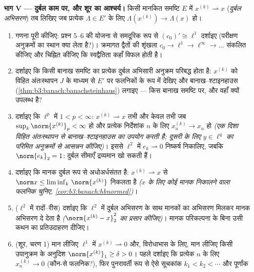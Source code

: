 \begin{problem}[{सप्ताहांत समस्या --- $(\ell^p)' = \ell^q$, स्वद्वैतिता, और
$\ell^\infty$ की विचित्रता}]
\medskip
\noindent\textbf{भाग V --- दुर्बल  काम पर, और शूर का
आश्चर्य।} किसी मानकित समष्टि $E$ में $x^{(k)} \rightharpoonup x$ (\emph{दुर्बल
अभिसरण}) तब लिखिए जब प्रत्येक $\Lambda \in E'$ के लिए $\Lambda(x^{(k)}) \to \Lambda(x)$ हो।
\begin{enumerate}[resume]
  \item गणना पूरी कीजिए: प्रश्न 5--6 की योजना से समदूरिक रूप से
        $(c_0)' \cong \ell^1$ दर्शाइए (परीक्षण अनुक्रमों का स्थान क्या लेता है?)।
        क्रमागत द्वैतों की शृंखला $c_0 \to \ell^1 \to \ell^\infty \to \dots$ संकलित कीजिए और चिह्नित
        कीजिए कि स्वद्वैतिता कहाँ विफल होती है।
  \item दर्शाइए कि किसी बानाख समष्टि का प्रत्येक दुर्बल अभिसारी
        अनुक्रम परिबद्ध होता है: $x^{(k)}$ को विहित अंतःस्थापन $J$
        के माध्यम से $E'$ पर फलनिकों के रूप में देखिए और
        बानाख--श्टाइनहाउस (\cref{thm:b3:banach:banachsteinhaus}) लगाइए --- किस बानाख समष्टि पर,
        और वहाँ  क्यों उपलब्ध है?
  \item दर्शाइए कि $\ell^p$ में $1 < p < \infty$: $x^{(k)}
        \rightharpoonup x$ तभी और केवल तभी जब
        $\sup_k\norm{x^{(k)}}_p <
        \infty$ हो और प्रत्येक निर्देशांक $n$ के लिए $x^{(k)}_n \to x_n$ हो
        \emph{(एक दिशा विहित अंतःस्थापन से बानाख--श्टाइनहाउस का
        उपयोग करती है; दूसरी के लिए $y
        \in \ell^q$ का परिमित अनुक्रमों से
        आसन्नन कीजिए)}। इससे $\ell^2$ में $e_k
        \rightharpoonup 0$ निष्कर्ष निकालिए,
        जबकि $\norm{e_k}_2 =
        1$: दुर्बल सीमाएँ द्रव्यमान खो सकती हैं।
  \item दर्शाइए कि मानक दुर्बल रूप से अधोअर्धसंतत है: $x^{(k)} \rightharpoonup x$ से
        $\norm x \leq
        \liminf_k\,\norm{x^{(k)}}$ निकलता है \emph{($x$ के लिए कोई मानक निकालने वाला
        फलनिक चुनिए, \cref{cor:b3:banach:hbnormed})}।
  \item ($\ell^2$ में रादों--रीस) दर्शाइए कि $\ell^2$ में दुर्बल अभिसरण
        के साथ मानकों का अभिसरण मिलकर मानक अभिसरण दे देता है
        \emph{($\norm{x^{(k)} -
        x}_2^2$ का प्रसार कीजिए)}। मानक परिकल्पना के बिना
        उसी कथन का प्रतिउदाहरण दीजिए।
  \item (शूर, चरण 1) मान लीजिए $\ell^1$ में $x^{(k)} \rightharpoonup 0$ और, विरोधाभास के
        लिए, मान लीजिए किसी उपानुक्रम के अनुदिश $\norm{x^{(k)}}_1 \geq \delta > 0$। पहले
        दर्शाइए कि प्रत्येक $n$ के लिए $x^{(k)}_n \to 0$ (कौन-से फलनिक?),
        फिर पुनरावर्ती रूप से ऐसे सूचकांक $k_1 < k_2 < \cdots$ और पूर्णांक

\end{enumerate}
\end{problem}

